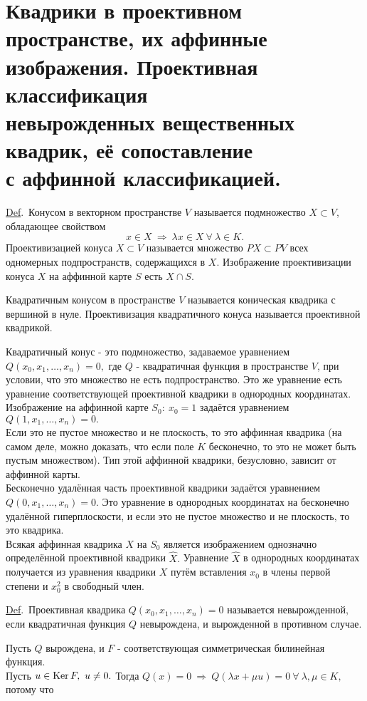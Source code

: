 \documentclass[draft]{article}%
\newcommand{\de}{\par\noindent\underline{Def}.\ }%
\newcommand{\ab}{\par\noindent}%
\newcommand{\rom}[1]{{\rm#1\,}}
\newcommand{\we}[1]{\widehat{#1}}
\begin{document}
\section{Квадрики в проективном пространстве, их аффинные\\ изображения. Проективная классификация\\ невырожденных вещественных квадрик,
её сопоставление\\ с аффинной классификацией.}
\label{q55}
\de Конусом в векторном пространстве $V$ называется подмножество $X\subset V$, обладающее свойством
$$
x\in X\ \Rightarrow\ \lambda x\in X\ \forall\ \lambda\in K.
$$
Проективизацией конуса $X\subset V$ называется множество $PX\subset PV$ всех одномерных подпространств, содержащихся в $X$.
Изображение проективизации конуса $X$ на аффинной карте $S$ есть $X\cap S$.
\ab Квадратичным конусом в пространстве $V$ называется коническая квадрика с вершиной в нуле. Проективизация квадратичного
конуса называется проективной квадрикой.\ab
Квадратичный конус - это подмножество, задаваемое уравнением $Q(x_0,x_1,\dots,x_n)=0,$ где $Q$ - квадратичная функция
в пространстве $V$, при условии, что это множество не есть подпространство.
Это же уравнение есть уравнение соответствующей проективной квадрики в однородных координатах. Изображение
на аффинной карте $S_0:\ x_0=1$ задаётся уравнением\ \ $Q(1,x_1,\dots,x_n)=0.$
\\Если это не пустое множество и не плоскость, то это аффинная квадрика (на самом деле, можно доказать,
что если поле $K$ бесконечно, то это не может быть пустым множеством). Тип этой аффинной квадрики, безусловно, зависит от аффинной карты.
\\ Бесконечно удалённая часть проективной квадрики задаётся уравнением\ \ $Q(0,x_1,\dots,x_n)=0.$ Это уравнение в
однородных координатах на бесконечно удалённой гиперплоскости, и если это не пустое множество и не плоскость, то это квадрика.
\\ Всякая аффинная квадрика $X$ на $S_0$ является изображением однозначно определённой проективной квадрики $\we{X}.$
Уравнение $\we X$ в однородных координатах получается из уравнения квадрики $X$ путём вставления $x_0$ в члены первой
степени и $x_0^2$ в свободный член.
\de Проективная квадрика $Q(x_0,x_1,\dots,x_n)=0$ называется невырожденной, если квадратичная функция $Q$ невырождена,
и вырожденной в противном случае.
\ab Пусть $Q$ вырождена, и $F$ - соответствующая симметрическая билинейная функция.\\ Пусть $u\in \rom{Ker}F,\ u\ne 0.$
Тогда $Q(x)=0\ \Rightarrow\ Q(\lambda x+\mu u)=0\ \forall\ \lambda,\mu\in K,$ потому что \\
\end{document}
